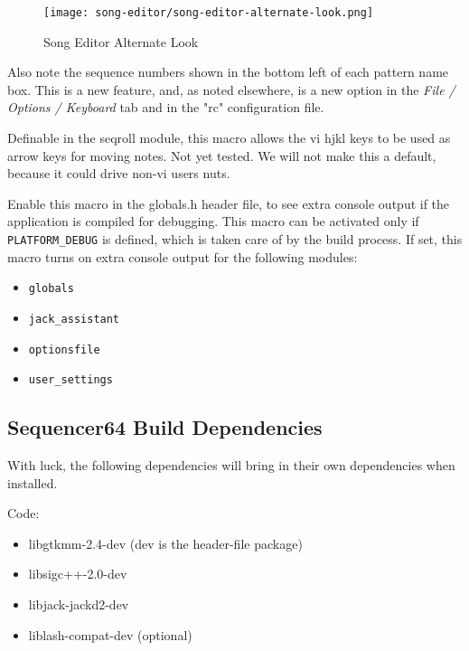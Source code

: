 \begin{figure}[H]
   \centering 
   \texttt{[image: song-editor/song-editor-alternate-look.png]}
   \caption{Song Editor Alternate Look}
   \label{fig:seq64_song_editor_alternate_look}
\end{figure}

      Also note the sequence numbers shown in the bottom left of each pattern
      name box. This is a new feature, and, as noted elsewhere, is a new
      option in the \textsl{File / Options / Keyboard} tab and in
      the "rc" configuration file.

        Definable in the seqroll module, this macro allows the vi hjkl keys to
        be used as arrow keys for moving notes.  Not yet tested.  We will not
        make this a default, because it could drive non-vi users nuts.

        Enable this macro in the globals.h header file, to see extra console
        output if the application is compiled for debugging.  This macro can be
        activated only if \texttt{PLATFORM\_DEBUG} is defined, which is taken
        care of by the build process.  If set, this macro turns on extra
        console output for the following modules:

        \begin{itemize}
           \item \texttt{globals}
           \item \texttt{jack\_assistant}
           \item \texttt{optionsfile}
           \item \texttt{user\_settings}
        \end{itemize}

\subsection{Sequencer64 Build Dependencies}
\label{subsec:seq64_build_dependencies}

   With luck, the following dependencies will bring in their own
   dependencies when installed.

   Code:

     \begin{itemize}
        \item libgtkmm-2.4-dev (dev is the header-file package)
        \item libsigc++-2.0-dev
        \item libjack-jackd2-dev
        \item liblash-compat-dev (optional)
     \end{itemize}


